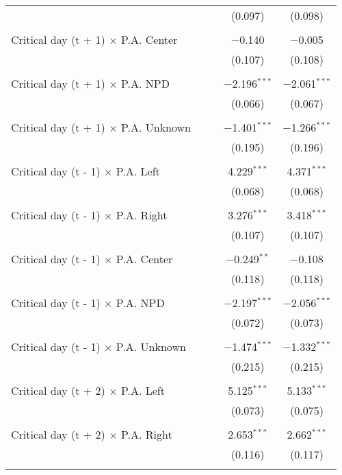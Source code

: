 \documentclass[
]{article}
\begin{document}
\begin{table}[!htbp]
{\begin{tabular}{@{\extracolsep{5pt}}lcccc}
  &  &  & (0.097) & (0.098) \\ 
  & & & & \\ 
 Critical day (t + 1) $\times$ P.A. Center &  &  & $-$0.140 & $-$0.005 \\ 
  &  &  & (0.107) & (0.108) \\ 
  & & & & \\ 
 Critical day (t + 1) $\times$ P.A. NPD &  &  & $-$2.196$^{***}$ & $-$2.061$^{***}$ \\ 
  &  &  & (0.066) & (0.067) \\ 
  & & & & \\ 
 Critical day (t + 1) $\times$ P.A. Unknown &  &  & $-$1.401$^{***}$ & $-$1.266$^{***}$ \\ 
  &  &  & (0.195) & (0.196) \\ 
  & & & & \\ 
 Critical day (t - 1) $\times$ P.A. Left &  &  & 4.229$^{***}$ & 4.371$^{***}$ \\ 
  &  &  & (0.068) & (0.068) \\ 
  & & & & \\ 
 Critical day (t - 1) $\times$ P.A. Right &  &  & 3.276$^{***}$ & 3.418$^{***}$ \\ 
  &  &  & (0.107) & (0.107) \\ 
  & & & & \\ 
 Critical day (t - 1) $\times$ P.A. Center &  &  & $-$0.249$^{**}$ & $-$0.108 \\ 
  &  &  & (0.118) & (0.118) \\ 
  & & & & \\ 
 Critical day (t - 1) $\times$ P.A. NPD &  &  & $-$2.197$^{***}$ & $-$2.056$^{***}$ \\ 
  &  &  & (0.072) & (0.073) \\ 
  & & & & \\ 
 Critical day (t - 1) $\times$ P.A. Unknown &  &  & $-$1.474$^{***}$ & $-$1.332$^{***}$ \\ 
  &  &  & (0.215) & (0.215) \\ 
  & & & & \\ 
 Critical day (t + 2) $\times$ P.A. Left &  &  & 5.125$^{***}$ & 5.133$^{***}$ \\ 
  &  &  & (0.073) & (0.075) \\ 
  & & & & \\ 
 Critical day (t + 2) $\times$ P.A. Right &  &  & 2.653$^{***}$ & 2.662$^{***}$ \\ 
  &  &  & (0.116) & (0.117) \\ 
  & & & & \\ 

\end{tabular}}
\end{table}
\end{document}
